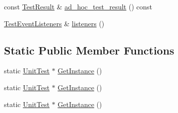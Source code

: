 \begin{DoxyCompactItemize}
\item 
const \mbox{\hyperlink{classtesting_1_1_test_result}{Test\+Result}} \& \mbox{\hyperlink{classtesting_1_1_unit_test_afb26f53c070675638033436f35bad889}{ad\+\_\+hoc\+\_\+test\+\_\+result}} () const
\item 
\mbox{\hyperlink{classtesting_1_1_test_event_listeners}{Test\+Event\+Listeners}} \& \mbox{\hyperlink{classtesting_1_1_unit_test_a1b7387b0b3daa2433ed6b685027bf285}{listeners}} ()
\end{DoxyCompactItemize}
\subsection*{Static Public Member Functions}
\begin{DoxyCompactItemize}
\item 
static \mbox{\hyperlink{classtesting_1_1_unit_test}{Unit\+Test}} $\ast$ \mbox{\hyperlink{classtesting_1_1_unit_test_a24192400b70b3b946746954e9574fb8e}{Get\+Instance}} ()
\item 
static \mbox{\hyperlink{classtesting_1_1_unit_test}{Unit\+Test}} $\ast$ \mbox{\hyperlink{classtesting_1_1_unit_test_af254e2e695471eb9f128bc556bae3668}{Get\+Instance}} ()
\item 
static \mbox{\hyperlink{classtesting_1_1_unit_test}{Unit\+Test}} $\ast$ \mbox{\hyperlink{classtesting_1_1_unit_test_af254e2e695471eb9f128bc556bae3668}{Get\+Instance}} ()
\end{DoxyCompactItemize}

